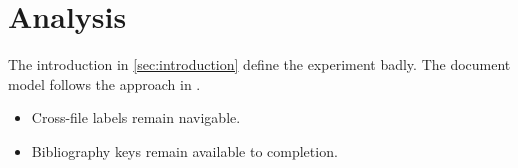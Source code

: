 \section{Analysis}\label{sec:analysis}

The introduction in \ref{sec:introduction} define the experiment badly.
The document model follows the approach in \cite{lamport1994}.

\begin{itemize}
  \item Cross-file labels remain navigable.
  \item Bibliography keys remain available to completion.
\end{itemize}

